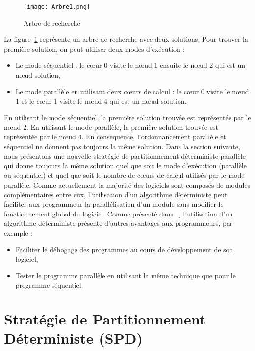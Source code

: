 \documentclass[parallelisme]{compas2014}
\begin{document}
\begin{figure}
\center \texttt{[image: Arbre1.png]}
\caption{Arbre de recherche}
\label{fig_arbre1}
\end{figure}

La figure~\ref{fig_arbre1} représente un arbre de recherche avec deux solutions. Pour trouver la première solution, on peut utiliser deux modes d'exécution :

\begin{itemize}
\item Le mode séquentiel : le cœur 0 visite le nœud 1 ensuite le nœud 2 qui est un nœud solution,
\item Le mode parallèle en utilisant deux cœurs de calcul : le cœur 0 visite le nœud 1 et le cœur 1 visite le nœud 4 qui est un nœud solution.
\end{itemize}

En utilisant le mode séquentiel, la première solution trouvée est représentée par le nœud 2. En utilisant le mode parallèle, la première solution trouvée est représentée par le nœud 4. En conséquence, l'ordonnancement parallèle et séquentiel ne donnent pas toujours la même solution. Dans la section suivante, nous présentons une nouvelle stratégie de partitionnement déterministe parallèle qui donne toujours la même solution quel que soit le mode d'exécution (parallèle ou séquentiel) et quel que soit le nombre de cœurs de calcul utilisés par le mode parallèle.
Comme actuellement la majorité des logiciels sont composés de modules complémentaires entre eux, l'utilisation d'un algorithme déterministe peut faciliter aux programmeur la parallélisation d'un module sans modifier le fonctionnement global du logiciel. Comme présenté dans ~\cite{BAAS09}, l'utilisation d'un algorithme déterministe présente d'autres avantages aux programmeurs, par exemple :

\begin{itemize}
\item Faciliter le débogage des programmes au cours de développement de son logiciel,
\item Tester le programme parallèle en utilisant la même technique que pour le programme séquentiel.
\end{itemize}

\section{Stratégie de Partitionnement Déterministe (SPD)}\label{SPD}
\end{document}
